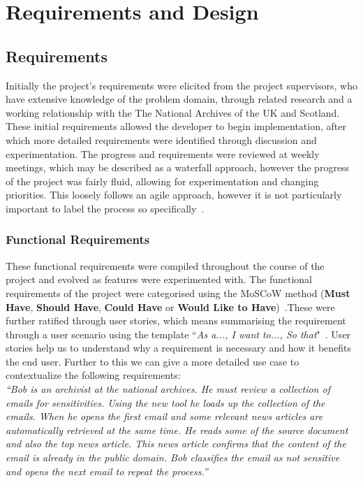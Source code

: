 \documentclass{l4proj}
\begin{document}
\chapter{Requirements and Design} \label{requirementsanddesign}
\section{Requirements}
Initially the project's requirements were elicited from the project supervisors, who have extensive knowledge of the problem domain, through related research and a working relationship with the The National Archives of the UK and Scotland.
These initial requirements allowed the developer to begin implementation, after which more detailed requirements were identified through discussion and experimentation. The progress and requirements were reviewed at weekly meetings, which may be described as a waterfall approach, however the progress of the project was fairly fluid, allowing for experimentation and changing priorities. This loosely follows an agile approach, however it is not particularly important to label the process so specifically~\cite{Sommerville:2010:SE:1841764}.

\subsection{Functional Requirements}
These functional requirements were compiled throughout the course of the project and evolved as features were experimented with.
The functional requirements of the project were categorised using the MoSCoW method (\textbf{Must Have}, \textbf{Should Have}, \textbf{Could Have} or \textbf{Would Like to Have})~\cite{storer_lecture_2014}.These were further ratified through user stories, which means summarising the requirement through a user scenario using the template ``\textit{As a..., I want to..., So that}"~\cite{storer_lecture_2014}. User stories help us to understand why a requirement is necessary and how it benefits the end user. Further to this we can give a more detailed use case to contextualize the following requirements:\\ 
\textit{``Bob is an archivist at the national archives. He must review a collection of emails for sensitivities. Using the new tool he loads up the collection of the emails. When he opens the first email and some relevant news articles are automatically retrieved at the same time. He reads some of the source document and also the top news article. This news article confirms that the content of the email is already in the public domain. Bob classifies the email as not sensitive and opens the next email to repeat the process.''}
\end{document}
